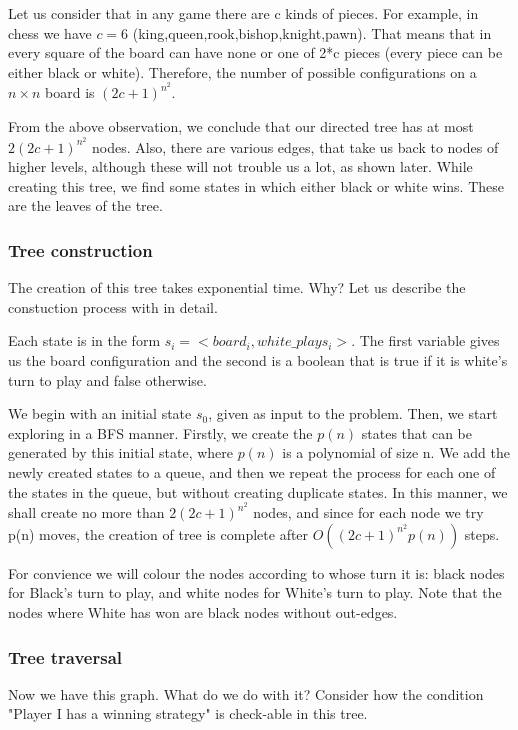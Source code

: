 Let us consider that in any game there are c kinds of pieces. For example, in chess we have $c=6$ (king,queen,rook,bishop,knight,pawn). That means that in
every square of the board can have none or one of 2*c pieces (every piece can
be either black or white).  Therefore, the number of possible
configurations on a $n \times n$ board is $(2c+1)^{n^2}$.


From the above observation, we conclude that our directed tree has at most $2(2c+1)^{n^2}$ nodes. Also, there are various edges,
that take us back to nodes of higher levels, although these will not trouble us a lot, as shown later. While
creating this tree, we find some states in which either black or white
wins. These are the leaves of the tree.

\subsubsection*{Tree construction}
The creation of this tree takes exponential time. Why? Let us describe the
constuction process with in detail.

Each state is in the form $s_i= <board_i, white\_plays_i>$. The first variable gives us the board configuration and
the second is a boolean that is true if it is white's turn to play and false otherwise.

We begin with an initial state $s_0$, given as input to the problem. Then, we start exploring in a BFS manner. Firstly, we
create the $p(n)$ states that can be generated by this initial state, where $p(n)$ is a polynomial of size n. We add the newly
created states to a queue, and then we repeat the process for each one of the states in the queue, but without creating
duplicate states. In this manner, we shall create no more than $2(2c+1)^{n^2}$ nodes, and since for each node we
try p(n) moves, the creation of tree is complete after $O((2c+1)^{n^2}p(n))$ steps.

For convience we will colour the nodes according to whose turn it is: black nodes for Black's turn to play, and white nodes for White's turn to play. Note that
the nodes where White has won are black nodes without out-edges.

\subsubsection*{Tree traversal}
Now we have this graph. What do we do with it? Consider how the condition
"Player I has a winning strategy" is check-able in this tree.

